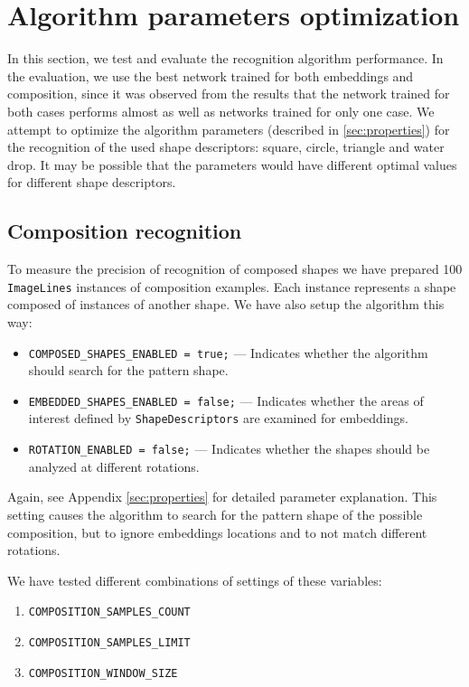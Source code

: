 \section{Algorithm parameters optimization}
In this section, we test and evaluate the recognition algorithm performance. In the evaluation, we use the best network trained for both embeddings and composition, since it was observed from the results that the network trained for both cases performs almost as well as networks trained for only one case. We attempt to optimize the algorithm parameters (described in \cref{sec:properties}) for the recognition of the used shape descriptors: square, circle, triangle and water drop. It may be possible that the parameters would have different optimal values for different shape descriptors.


\subsection{Composition recognition}
To measure the precision of recognition of composed shapes we have prepared 100 \texttt{ImageLines} instances of composition examples. Each instance represents a shape composed of instances of another shape. We have also setup the algorithm this way:
\begin{itemize}
\item \texttt{COMPOSED\_SHAPES\_ENABLED = true;} --- Indicates whether the algorithm should search for the pattern shape.
\item \texttt{EMBEDDED\_SHAPES\_ENABLED = false;} --- Indicates whether the areas of interest defined by \texttt{ShapeDescriptors} are examined for embeddings.
\item \texttt{ROTATION\_ENABLED = false;} --- Indicates whether the shapes should be analyzed at different rotations.
\end{itemize} Again, see Appendix \cref{sec:properties} for detailed parameter explanation.
This setting causes the algorithm to search for the pattern shape of the possible composition, but to ignore embeddings locations and to not match different rotations.

We have tested different combinations of settings of these variables:
\begin{enumerate}
\item \texttt{COMPOSITION\_SAMPLES\_COUNT}
\item \texttt{COMPOSITION\_SAMPLES\_LIMIT}
\item \texttt{COMPOSITION\_WINDOW\_SIZE} 
\end{enumerate}

